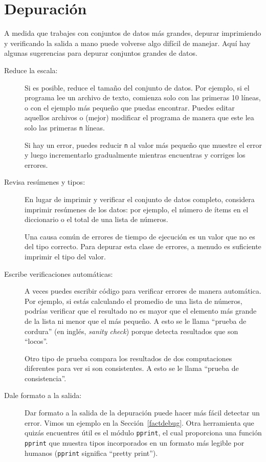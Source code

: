 \documentclass[10pt]{book}
\begin{document}
\section{Depuración}

A medida que trabajes con conjuntos de datos más grandes, depurar imprimiendo y
verificando la salida a mano puede volverse algo difícil de manejar.  Aquí hay algunas
sugerencias para depurar conjuntos grandes de datos.

\begin{description}

\item[Reduce la escala:] Si es posible, reduce el tamaño del
conjunto de datos.  Por ejemplo, si el programa lee un archivo de texto, comienza 
solo con las primeras 10 líneas, o con el ejemplo más pequeño que puedas encontrar.
Puedes editar aquellos archivos o (mejor) modificar el
programa de manera que este lea solo las primeras {\tt n} líneas.

Si hay un error, puedes reducir {\tt n} al valor más pequeño
que muestre el error y luego incrementarlo gradualmente
mientras encuentras y corriges los errores.

\item[Revisa resúmenes y tipos:] En lugar de imprimir y verificar el conjunto
de datos completo, considera imprimir resúmenes de los datos: por ejemplo,
el número de ítems en el diccionario o el total de una lista de números.

Una causa común de errores de tiempo de ejecución es un valor que no es del tipo
correcto.  Para depurar esta clase de errores, a menudo es suficiente imprimir
el tipo del valor.

\item[Escribe verificaciones automáticas:]  A veces puedes escribir código para verificar
errores de manera automática. Por ejemplo, si estás calculando el
promedio de una lista de números, podrías verificar que el resultado no
es mayor que el elemento más grande de la lista ni menor que
el más pequeño. A esto se le llama ``prueba de cordura'' (en inglés, {\em sanity check})
porque detecta resultados que son ``locos''.

Otro tipo de prueba compara los resultados de dos computaciones
diferentes para ver si son consistentes. A esto se le llama
``prueba de consistencia''.

\item[Dale formato a la salida:] Dar formato a la salida de la depuración
puede hacer más fácil detectar un error.  Vimos un ejemplo en la 
Sección~\ref{factdebug}.  Otra herramienta que quizás encuentres útil es el módulo {\tt pprint},
el cual proporciona una función {\tt pprint} que muestra tipos incorporados en
un formato más legible por humanos ({\tt pprint} significa
``pretty print'').

\end{description}
\end{document}
